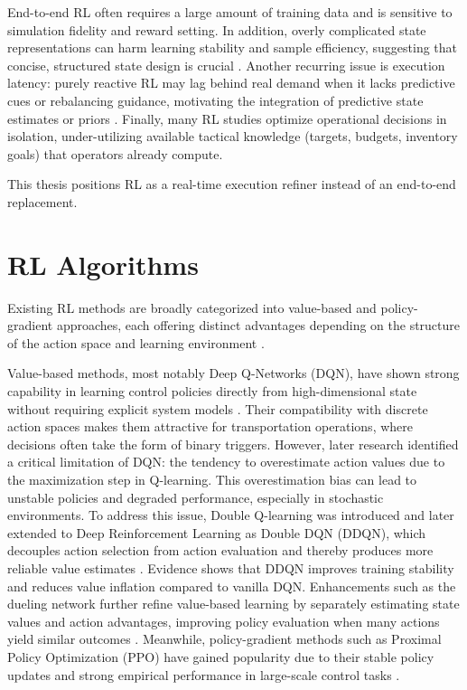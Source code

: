 End-to-end RL often requires a large amount of training data and is sensitive to simulation fidelity and reward setting. In addition, overly complicated state representations can harm learning stability and sample efficiency, suggesting that concise, structured state design is crucial \parencite{schofield2024}. Another recurring issue is execution latency: purely reactive RL may lag behind real demand when it lacks predictive cues or rebalancing guidance, motivating the integration of predictive state estimates or priors \parencite{papadis2023}. Finally, many RL studies optimize operational decisions in isolation, under-utilizing available tactical knowledge (targets, budgets, inventory goals) that operators already compute.

This thesis positions RL as a real-time execution refiner instead of an end-to-end replacement.

\section{RL Algorithms}
Existing RL methods are broadly categorized into value-based and policy-gradient approaches, each offering distinct advantages depending on the structure of the action space and learning environment \parencite{sutton1998reinforcement}.

Value-based methods, most notably Deep Q-Networks (DQN), have shown strong capability in learning control policies directly from high-dimensional state without requiring explicit system models \parencite{mnih2015human}. Their compatibility with discrete action spaces makes them attractive for transportation operations, where decisions often take the form of binary triggers. However, later research identified a critical limitation of DQN: the tendency to overestimate action values due to the maximization step in Q-learning. This overestimation bias can lead to unstable policies and degraded performance, especially in stochastic environments. To address this issue, Double Q-learning was introduced and later extended to Deep Reinforcement Learning as Double DQN (DDQN), which decouples action selection from action evaluation and thereby produces more reliable value estimates \parencite{van2016deep}. Evidence shows that DDQN improves training stability and reduces value inflation compared to vanilla DQN. Enhancements such as the dueling network further refine value-based learning by separately estimating state values and action advantages, improving policy evaluation when many actions yield similar outcomes \parencite{wang2016dueling}. Meanwhile, policy-gradient methods such as Proximal Policy Optimization (PPO) have gained popularity due to their stable policy updates and strong empirical performance in large-scale control tasks \parencite{schulman2017proximal}.


